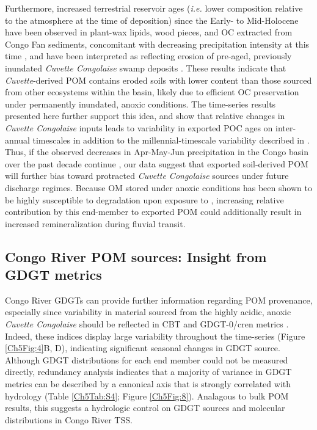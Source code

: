 Furthermore, increased terrestrial reservoir ages (\textit{i.e.} lower  composition relative to the atmosphere at the time of deposition) since the Early- to Mid-Holocene have been observed in plant-wax lipids, wood pieces, and OC extracted from Congo Fan sediments, concomitant with decreasing precipitation intensity at this time \citep{Schefuss:2005jo}, and have been interpreted as reflecting erosion of pre-aged, previously inundated \textit{Cuvette Congolaise} swamp deposits \citep{Schefuss:2016cp}. These results indicate that \textit{Cuvette}-derived POM contains eroded soils with lower  content than those sourced from other ecosystems within the basin, likely due to efficient OC preservation under permanently inundated, anoxic conditions. The time-series  results presented here further support this idea, and show that relative changes in \textit{Cuvette Congolaise} inputs leads to variability in exported POC ages on inter-annual timescales in addition to the millennial-timescale variability described in \citet{Schefuss:2016cp}. Thus, if the observed decreases in Apr-May-Jun precipitation in the Congo basin over the past decade continue \citep{Zhou:2014gl}, our data suggest that exported soil-derived POM will further bias toward protracted \textit{Cuvette Congolaise} sources under future discharge regimes. Because OM stored under anoxic conditions has been shown to be highly susceptible to degradation upon exposure to  \citep{Hoefs:2002wu}, increasing relative contribution by this end-member to exported POM could additionally result in increased remineralization during fluvial transit.

\subsection{Congo River POM sources: Insight from GDGT metrics}

Congo River GDGTs can provide further information regarding POM provenance, especially since variability in material sourced from the highly acidic, anoxic \textit{Cuvette Congolaise} \citep{Mann:2014jx} should be reflected in CBT and GDGT-0/cren metrics \citep{Blaga:2009ge,Peterse:2012bs}. Indeed, these indices display large variability throughout the time-series (Figure \ref{Ch5Fig:4}B, D), indicating significant seasonal changes in GDGT source. Although GDGT distributions for each end member could not be measured directly, redundancy analysis \citep[RDA;][]{Legendre:1998tt} indicates that a majority of variance in GDGT metrics can be described by a canonical axis that is strongly correlated with hydrology (Table \ref{Ch5Tab:S4}; Figure \ref{Ch5Fig:8}). Analagous to bulk POM results, this suggests a hydrologic control on GDGT sources and molecular distributions in Congo River TSS. 

